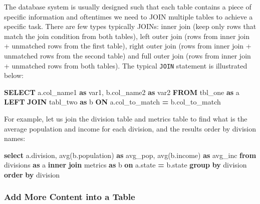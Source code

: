 \documentclass[
  12pt,
]{krantz}
\makeatletter
\newenvironment{Shaded}{\begin{snugshade}}{\end{snugshade}}
\newcommand{\FunctionTok}[1]{\textcolor[rgb]{0,0,0}{#1}}
\newcommand{\KeywordTok}[1]{\textcolor[rgb]{0.27,0.27,0.27}{\textbf{#1}}}
\newcommand{\NormalTok}[1]{#1}
\newcommand{\OperatorTok}[1]{\textcolor[rgb]{0.43,0.43,0.43}{\textbf{#1}}}
\newenvironment{kframe}{%
\medskip{}
\setlength{\fboxsep}{.8em}
 \def\at@end@of@kframe{}%
 \ifinner\ifhmode%
  \def\at@end@of@kframe{\end{minipage}}%
  \begin{minipage}{\columnwidth}%
 \fi\fi%
 \def\FrameCommand##1{\hskip\@totalleftmargin \hskip-\fboxsep
 \colorbox{shadecolor}{##1}\hskip-\fboxsep
     \hskip-\linewidth \hskip-\@totalleftmargin \hskip\columnwidth}%
 \MakeFramed {\advance\hsize-\width
   \@totalleftmargin\z@ \linewidth\hsize
   \@setminipage}}%
 {\par\unskip\endMakeFramed%
 \at@end@of@kframe}
\renewenvironment{Shaded}{\begin{kframe}}{\end{kframe}}
\makeatother
\begin{document}
The database system is usually designed such that each table contains a piece of specific information and oftentimes we need to JOIN multiple tables to achieve a specific task. There are few types typically JOINs: inner join (keep only rows that match the join condition from both tables), left outer join (rows from inner join + unmatched rows from the first table), right outer join (rows from inner join + unmatched rows from the second table) and full outer join (rows from inner join + unmatched rows from both tables). The typical \texttt{JOIN} statement is illustrated below:

\begin{Shaded}
\begin{Highlighting}[]
\KeywordTok{SELECT}\NormalTok{ a.col\_name1 }\KeywordTok{as}\NormalTok{ var1, b.col\_name2 }\KeywordTok{as}\NormalTok{ var2}
\KeywordTok{FROM}\NormalTok{ tbl\_one }\KeywordTok{as}\NormalTok{ a}
\KeywordTok{LEFT} \KeywordTok{JOIN}\NormalTok{ tabl\_two }\KeywordTok{as}\NormalTok{ b}
\KeywordTok{ON}\NormalTok{ a.col\_to\_match }\OperatorTok{=}\NormalTok{ b.col\_to\_match}
\end{Highlighting}
\end{Shaded}

For example, let us join the division table and metrics table to find what is the average population and income for each division, and the results order by division names:

\begin{Shaded}
\begin{Highlighting}[]
\KeywordTok{select}\NormalTok{ a.division, }\FunctionTok{avg}\NormalTok{(b.population) }\KeywordTok{as}\NormalTok{ avg\_pop,}
\FunctionTok{avg}\NormalTok{(b.income) }\KeywordTok{as}\NormalTok{ avg\_inc}
\KeywordTok{from}\NormalTok{ divisions }\KeywordTok{as}\NormalTok{ a}
\KeywordTok{inner} \KeywordTok{join}\NormalTok{ metrics }\KeywordTok{as}\NormalTok{ b}
\KeywordTok{on}\NormalTok{ a.state }\OperatorTok{=}\NormalTok{ b.state}
\KeywordTok{group} \KeywordTok{by}\NormalTok{ division}
\KeywordTok{order} \KeywordTok{by}\NormalTok{ division}
\end{Highlighting}
\end{Shaded}

\hypertarget{add-more-content-into-a-table}{%
\subsubsection{Add More Content into a Table}\label{add-more-content-into-a-table}}
\end{document}
